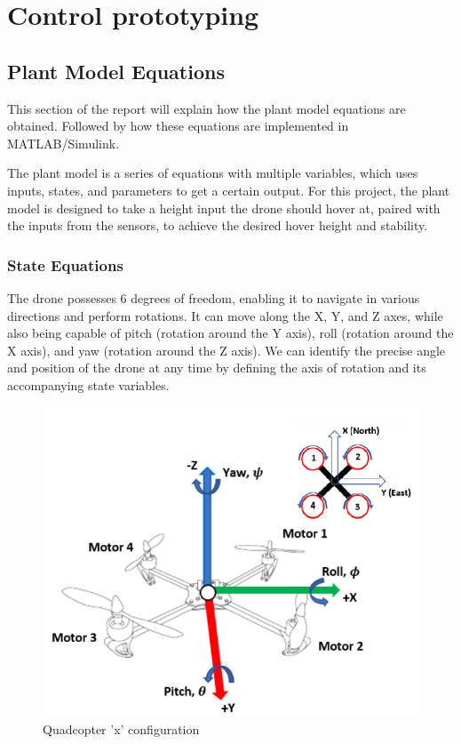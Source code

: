 \section{Control prototyping}
\subsection{Plant Model Equations}\label{plant_eq}
This section of the report will explain how the plant model equations are obtained. Followed by how these equations are implemented in MATLAB/Simulink.

The plant model is a series of equations with multiple variables, which uses inputs, states, and parameters to get a certain output. 
For this project, the plant model is designed to take a height input the drone should hover at, paired with the inputs from the sensors, to achieve the desired hover height and stability.

\subsubsection{State Equations}
The drone possesses 6 degrees of freedom, enabling it to navigate in various directions and perform rotations. It can move along the X, Y, and Z axes, while also being capable of pitch (rotation around the Y axis), roll (rotation around the X axis), and yaw (rotation around the Z axis). We can identify the precise angle and position of the drone at any time by defining the axis of rotation and its accompanying state variables.
\cite{Ferry}

\begin{figure}[H]
\begin{center}
    \includegraphics[scale =0.7]{pictures/control/drone directionals.png}
\end{center}
\caption{Quadcopter 'x' configuration}
\end{figure}

